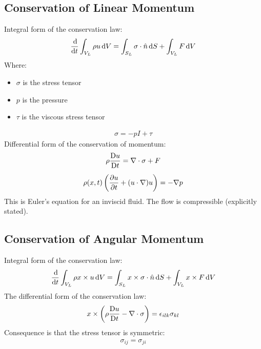 \documentclass[class=report, crop=false, 12pt,a4paper]{standalone}
\begin{document}
\subsection{Conservation of Linear Momentum}
Integral form of the conservation law: 
\begin{gather}
    \frac{\dif}{\dif t} \int_{V_L} \rho u \dif V = \int_{S_L} \sigma \cdot \hat{n} \dif S + \int_{V_L} F \dif V
\end{gather}
Where: 
\begin{itemize}[noitemsep]
    \item $\sigma$ is the stress tensor
    \item $p$ is the pressure 
    \item $\tau$ is the viscous stress tensor
\end{itemize}
\begin{gather}
    \sigma = -pI + \tau
\end{gather}
Differential form of the conservation of momentum: 
\begin{gather}
    \rho \frac{\Dif u}{\Dif t} = \nabla \cdot \sigma + F \\[5pt]
    \rho (x,t) \left( \frac{\partial u}{\partial t} + (u\cdot \nabla)u \right) = -\nabla p
\end{gather}
This is Euler’s equation for an inviscid fluid.
The flow is compressible (explicitly stated). 
\subsection{Conservation of Angular Momentum}
Integral form of the conservation law: 
\begin{gather}
    \frac{\dif}{\dif t}\int_{V_L} \rho x \times u \dif V = \int_{S_L} x \times \sigma \cdot \hat{n} \dif S + \int_{V_L} x \times F \dif V
\end{gather}
The differential form of the conservation law: 
\begin{gather}
    x \times \left( \rho \frac{\Dif u}{\Dif t} - \nabla \cdot \sigma \right) = \epsilon_{ilk}\sigma_{kl}
\end{gather}
Consequence is that the stress tensor is symmetric: 
\begin{gather}
    \sigma_{ij} = \sigma_{ji}
\end{gather}
\end{document}

